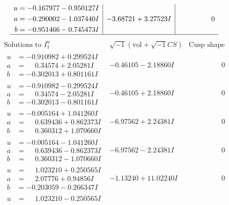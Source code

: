 \documentclass[1p]{elsarticle_modified}
\theoremstyle{definition}
\newcommand{\I}{\sqrt{-1}}
\begin{document}
$$\begin{array}{c|c|c}
\begin{aligned}
u &= -0.167977 - 0.950127 I \\
a &= -0.290002 - 1.037440 I \\
b &= -0.951466 - 0.745473 I\end{aligned}
 & -3.68721 + 3.27523 I & \phantom{-0.000000 } 0\\
 \hline 
 \end{array}$$\newpage$$\begin{array}{c|c|c}  
\text{Solutions to }I^u_{1}& \I (\text{vol} + \sqrt{-1}CS) & \text{Cusp shape}\\
 \hline 
\begin{aligned}
u &= -0.910982 + 0.299524 I \\
a &= \phantom{-}0.34574 + 2.05281 I \\
b &= -0.302013 + 0.801161 I\end{aligned}
 & -0.46105 - 2.18860 I & \phantom{-0.000000 } 0 \\ \hline\begin{aligned}
u &= -0.910982 - 0.299524 I \\
a &= \phantom{-}0.34574 - 2.05281 I \\
b &= -0.302013 - 0.801161 I\end{aligned}
 & -0.46105 + 2.18860 I & \phantom{-0.000000 } 0 \\ \hline\begin{aligned}
u &= -0.005164 + 1.041260 I \\
a &= \phantom{-}0.639436 + 0.862373 I \\
b &= \phantom{-}0.360312 + 1.070660 I\end{aligned}
 & -6.97562 + 2.24381 I & \phantom{-0.000000 } 0 \\ \hline\begin{aligned}
u &= -0.005164 - 1.041260 I \\
a &= \phantom{-}0.639436 - 0.862373 I \\
b &= \phantom{-}0.360312 - 1.070660 I\end{aligned}
 & -6.97562 - 2.24381 I & \phantom{-0.000000 } 0 \\ \hline\begin{aligned}
u &= \phantom{-}1.023210 + 0.250565 I \\
a &= \phantom{-}2.07776 + 0.94856 I \\
b &= -0.203059 - 0.266347 I\end{aligned}
 & -1.13240 + 11.02240 I & \phantom{-0.000000 } 0 \\ \hline\begin{aligned}
u &= \phantom{-}1.023210 - 0.250565 I \\

\end{aligned}
\end{array}$$
\end{document}
